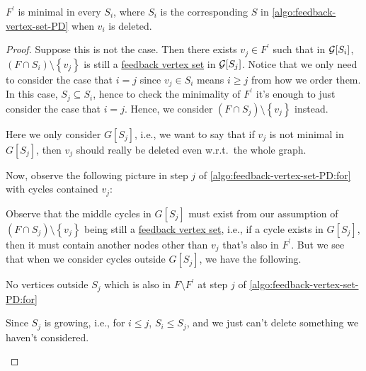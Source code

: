 \begin{lemma}\label{lma:lec4-3}
	\(F^\prime \) is minimal in every \(S_i\), where \(S_i\) is the corresponding \(S\) in \autoref{algo:feedback-vertex-set-PD} when \(v_i\) is deleted.
\end{lemma}
\begin{proof}
	Suppose this is not the case. Then there exists \(v_j\in F^\prime \) such that in \(\mathcal{\MakeUppercase{g}} [S_i]\), \((F \cap S_i) \setminus \left\{ v_{j}  \right\}\) is still a \hyperref[prb:feedback-vertex-set]{feedback vertex set} in \(\mathcal{\MakeUppercase{g}} [S_j]\). Notice that we only need to consider the case that \(i = j\) since \(v_{j}\in S_i\) means \(i \geq j\) from how we order them. In this case, \(S_j \subseteq S_i\), hence to check the minimality of \(F^\prime \) it's enough to just consider the case that \(i = j\). Hence, we consider \((F \cap S_j) \setminus \left\{ v_{j}  \right\}\) instead.

	\begin{note}
		Here we only consider \(G[S_j]\), i.e., we want to say that if \(v_j\) is not minimal in \(G[S_j]\), then \(v_j\) should really be deleted even w.r.t.\ the whole graph.
	\end{note}

	Now, observe the following picture in step \(j\) of \autoref{algo:feedback-vertex-set-PD:for} with cycles contained \(v_j\):
	\begin{figure}[H]
		\centering
	\end{figure}

	Observe that the middle cycles in \(G[S_j]\) must exist from our assumption of \((F \cap S_j) \setminus \left\{ v_{j}  \right\}\) being still a \hyperref[prb:feedback-vertex-set]{feedback vertex set}, i.e., if a cycle exists in \(G[S_j]\), then it must contain another nodes other than \(v_j\) that's also in \(F^\prime \). But we see that when we consider cycles outside \(G[S_j]\), we have the following.
	\begin{claim}
		No vertices outside \(S_j\) which is also in \(F\setminus F^\prime \) at step \(j\) of \autoref{algo:feedback-vertex-set-PD:for}
	\end{claim}
	\begin{explanation}
		Since \(S_j\) is growing, i.e., for \(i \leq j\), \(S_i \leq S_j\), and we just can't delete something we haven't considered.
	\end{explanation}


\end{proof}
